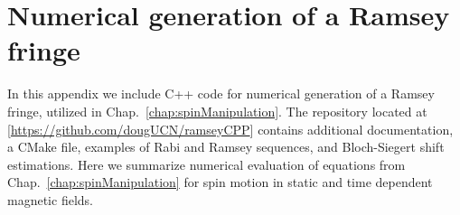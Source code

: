 
\chapter{Numerical generation of a Ramsey fringe}\label{appx:ramsey_numerical}


In this appendix we include C++ code for numerical generation of a Ramsey fringe, utilized in Chap.~\ref{chap:spinManipulation}. The repository located at [\url{https://github.com/dougUCN/ramseyCPP}] contains additional documentation, a CMake file, examples of Rabi and Ramsey sequences, and Bloch-Siegert shift estimations. Here we summarize numerical evaluation of equations from Chap.~\ref{chap:spinManipulation} for \ucn spin motion in static and time dependent magnetic fields.

